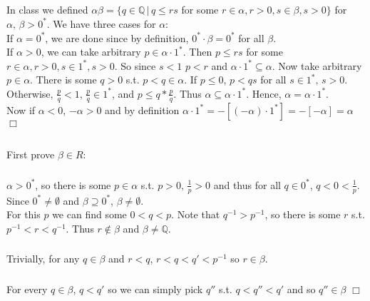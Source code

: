 \documentclass{article}
\begin{document}
\subsection{}
In class we defined $\alpha\beta = \{ q \in \mathbb{Q} \,|\, q \leq rs$ for some $r\in\alpha, r>0,s\in\beta, s>0\}$ for $\alpha,\,\beta > 0^*$. We have three cases for $\alpha$:\\
If $\alpha = 0^*$, we are done since by definition, $0^*\cdot \beta = 0^*$ for all $\beta$.\\
If $\alpha > 0$, we can take arbitrary $p \in \alpha \cdot 1^*$. Then $p \leq rs$ for some $r\in\alpha, r>0,s\in 1^*, s>0$. So since $s<1$ $p<r$ and $\alpha \cdot 1^* \subseteq \alpha$. Now take arbitrary $p \in \alpha$. There is some $q>0$ s.t. $p<q \in \alpha$. If $p\leq 0$, $p < qs$ for all $s \in 1^*,\, s>0$. Otherwise, $\frac{p}{q} < 1$, $\frac{p}{q} \in 1^*$, and $p \leq q * \frac{p}{q}$. Thus $\alpha \subseteq \alpha \cdot 1^*$. Hence, $\alpha = \alpha \cdot 1^*$.\\
Now if $\alpha < 0$, $-\alpha > 0$ and by definition $\alpha\cdot 1^* = -[(-\alpha)\cdot 1^*] = -[-\alpha] = \alpha$ $\Box$

\subsection{}
\indent First prove $\beta \in R$:
\subsubsection{}
$\alpha > 0^*$, so there is some $p\in \alpha$ s.t. $p > 0,\,\frac{1}{p} > 0$ and thus for all $q \in 0^*$, $q<0<\frac{1}{p}$. Since $0^* \neq \emptyset $ and $\beta \supseteq 0^*$, $\beta \neq \emptyset $.\\
For this $p$ we can find some $0<q<p$. Note that $q^{-1} > p^{-1}$, so there is some $r$ s.t. $p^{-1} < r < q^{-1}$. Thus $r \notin \beta$ and $\beta \neq \mathbb{Q}$.
\subsubsection{}
Trivially, for any $q \in \beta$ and $r<q$, $r<q<q'<p^{-1}$ so $r \in \beta$.
\subsubsection{}
For every $q \in \beta$, $q<q'$ so we can simply pick $q''$ s.t. $q<q''<q'$ and so $q'' \in \beta$ $\Box$\\
\end{document}
